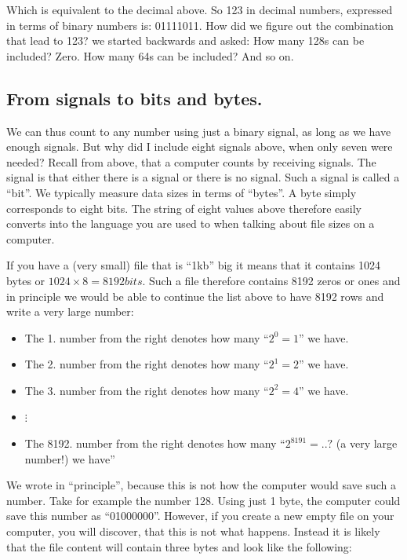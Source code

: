 \documentclass[
]{book}
\providecommand{\tightlist}{%
  \setlength{\itemsep}{0pt}\setlength{\parskip}{0pt}}
\begin{document}
Which is equivalent to the decimal above. So 123 in decimal numbers, expressed in terms of binary numbers is: 01111011. How did we figure out the combination that lead to 123? we started backwards and asked: How many 128s can be included? Zero. How many 64s can be included? And so on.

\hypertarget{from-signals-to-bits-and-bytes.}{%
\subsection*{From signals to bits and bytes.}\label{from-signals-to-bits-and-bytes.}}

We can thus count to any number using just a binary signal, as long as we have enough signals. But why did I include eight signals above, when only seven were needed? Recall from above, that a computer counts by receiving signals. The signal is that either there is a signal or there is no signal. Such a signal is called a ``bit''. We typically measure data sizes in terms of ``bytes''. A byte simply corresponds to eight bits. The string of eight values above therefore easily converts into the language you are used to when talking about file sizes on a computer.

If you have a (very small) file that is ``1kb'' big it means that it contains 1024 bytes or \(1024\times 8= 8192 bits\). Such a file therefore contains 8192 zeros or ones and in principle we would be able to continue the list above to have 8192 rows and write a very large number:

\begin{itemize}
\tightlist
\item
  The 1. number from the right denotes how many ``\(2^0=1\)'' we have.
\item
  The 2. number from the right denotes how many ``\(2^1=2\)'' we have.
\item
  The 3. number from the right denotes how many ``\(2^2=4\)'' we have.
\item
  \(\vdots\)
\item
  The 8192. number from the right denotes how many ``\(2^{8191}=..?\) (a very large number!) we have''
\end{itemize}

We wrote in ``principle'', because this is not how the computer would save such a number. Take for example the number 128. Using just 1 byte, the computer could save this number as ``01000000''. However, if you create a new empty file on your computer, you will discover, that this is not what happens. Instead it is likely that the file content will contain three bytes and look like the following:
\end{document}
